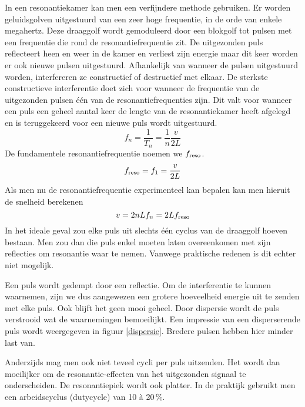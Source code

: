 In een resonantiekamer kan men een verfijndere methode gebruiken. Er worden 
geluidsgolven uitgestuurd van een zeer hoge frequentie, in de orde van enkele 
megahertz. Deze draaggolf wordt gemoduleerd door een blokgolf tot pulsen met 
een frequentie die rond de resonantiefrequentie zit. De uitgezonden puls 
reflecteert heen en weer in de kamer en verliest zijn energie maar dit keer 
worden er ook nieuwe pulsen uitgestuurd. Afhankelijk van wanneer de pulsen 
uitgestuurd worden, interfereren ze constructief of destructief met elkaar. De 
sterkste constructieve interferentie doet zich voor wanneer de frequentie van 
de uitgezonden pulsen \'e\'en van de resonantiefrequenties zijn. Dit valt voor 
wanneer een puls een geheel aantal keer de lengte van de resonantiekamer heeft 
afgelegd en is teruggekeerd voor een nieuwe puls wordt uitgestuurd.
\begin{equation}
\label{resfreq}
f_n = \frac{1}{T_n} = \frac{1}{n} \frac{v}{2L}
\end{equation}
De fundamentele resonantiefrequentie noemen we $f_\mathrm{reso}$.
$$
f_\mathrm{reso} = f_1 = \frac{v}{2L}
$$
Als men nu de resonantiefrequentie experimenteel kan bepalen kan men hieruit de 
snelheid berekenen
\begin{equation}
\label{v-ifv-f}
v = 2nLf_n = 2L f_\mathrm{reso}
\end{equation}
In het ideale geval zou elke puls uit slechts \'e\'en cyclus van de draaggolf 
hoeven bestaan. Men zou dan die puls enkel moeten laten overeenkomen met zijn 
reflecties om resonantie waar te nemen. Vanwege praktische redenen is dit 
echter niet mogelijk.

Een puls wordt gedempt door een reflectie. Om de interferentie te kunnen 
waarnemen, zijn we dus aangewezen een grotere hoeveelheid energie uit te zenden 
met elke puls. Ook blijft het geen mooi geheel. Door dispersie wordt de puls 
verstrooid wat de waarnemingen bemoeilijkt. Een impressie van een disperserende 
puls wordt weergegeven in figuur \ref{dispersie}. Bredere pulsen hebben hier 
minder last van.


Anderzijds mag men ook niet teveel cycli per puls uitzenden. Het wordt dan 
moeilijker om de resonantie-effecten van het uitgezonden signaal te 
onderscheiden. De resonantiepiek wordt ook platter. In de praktijk gebruikt men 
een arbeidscyclus (dutycycle) van 10 \`a 20\,\%.

